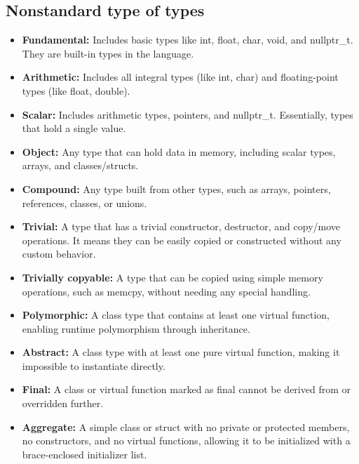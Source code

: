 \documentclass{report}
\begin{document}
   \subsection{Nonstandard type of types}
   \bigbreak \noindent 
   \begin{itemize}
       \item \textbf{Fundamental:} Includes basic types like int, float, char, void, and nullptr\_t. They are built-in types in the language.
       \item \textbf{Arithmetic:} Includes all integral types (like int, char) and floating-point types (like float, double).
       \item \textbf{Scalar:} Includes arithmetic types, pointers, and nullptr\_t. Essentially, types that hold a single value.
       \item \textbf{Object:} Any type that can hold data in memory, including scalar types, arrays, and classes/structs.
       \item \textbf{Compound:} Any type built from other types, such as arrays, pointers, references, classes, or unions.
       \item \textbf{Trivial:} A type that has a trivial constructor, destructor, and copy/move operations. It means they can be easily copied or constructed without any custom behavior.
       \item \textbf{Trivially copyable:} A type that can be copied using simple memory operations, such as memcpy, without needing any special handling.
       \item \textbf{Polymorphic:} A class type that contains at least one virtual function, enabling runtime polymorphism through inheritance.
       \item \textbf{Abstract:} A class type with at least one pure virtual function, making it impossible to instantiate directly.
       \item \textbf{Final:} A class or virtual function marked as final cannot be derived from or overridden further.
       \item \textbf{Aggregate:} A simple class or struct with no private or protected members, no constructors, and no virtual functions, allowing it to be initialized with a brace-enclosed initializer list.
   \end{itemize}


   \bigbreak \noindent 
\end{document}

